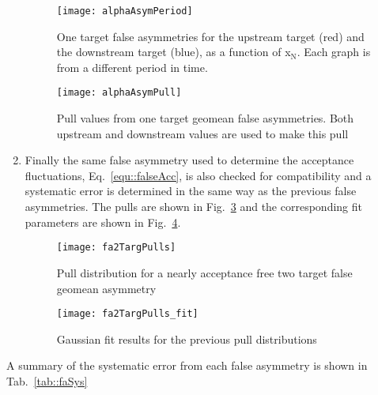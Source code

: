\begin{enumerate}
  \begin{figure}[h!t]
    \centering
    \texttt{[image: alphaAsymPeriod]}
    \caption{One target false asymmetries for the upstream target (red) and the
      downstream target (blue), as a function of x$_{\mathrm{N}}$.  Each graph
      is from a different period in time.}
    \label{fig::alphaAsymPeriod}
  \end{figure}

  \begin{figure}[h!t]
    \centering
    \texttt{[image: alphaAsymPull]}
    \caption{Pull values from one target geomean false asymmetries.  Both
      upstream and downstream values are used to make this pull}
    \label{fig::alphaAsymPull}
  \end{figure}

\item Finally the same false asymmetry used to determine the acceptance
  fluctuations, Eq.~\ref{equ::falseAcc}, is also checked for compatibility and a
  systematic error is determined in the same way as the previous false
  asymmetries.  The pulls are shown in Fig.~\ref{fig::fa2TargPulls} and the
  corresponding fit parameters are shown in Fig.~\ref{fig::fa2TargPulls_fit}.

  \begin{figure}[h!t]
    \centering
    \texttt{[image: fa2TargPulls]}
    \caption{Pull distribution for a nearly acceptance free two target false
      geomean asymmetry}
    \label{fig::fa2TargPulls}
  \end{figure}
  
  \begin{figure}[h!t]
    \centering
    \texttt{[image: fa2TargPulls\_fit]}
    \caption{Gaussian fit results for the previous pull
      distributions}
    \label{fig::fa2TargPulls_fit}
  \end{figure}
  
\end{enumerate}

A summary of the systematic error from each false asymmetry is shown in
Tab.~\ref{tab::faSys}


